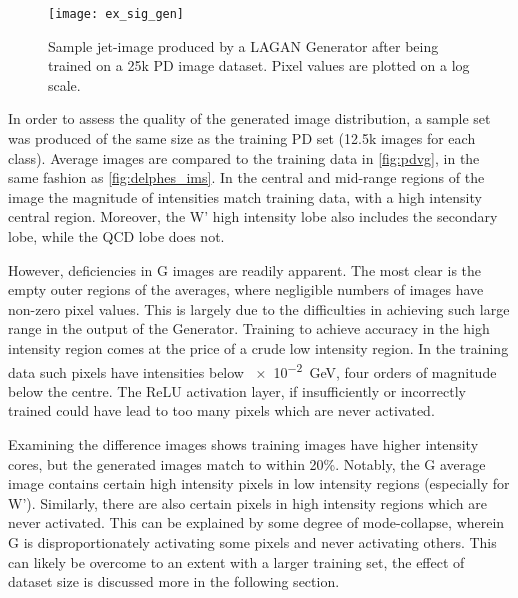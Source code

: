 \documentclass[twocolumn,twoside]{article}
\newcommand{\gev}{\giga\electronvolt}
\begin{document}
\begin{figure}[H]
	\centering
	\texttt{[image: ex\_sig\_gen]}
	
	\caption{Sample jet-image produced by a LAGAN Generator after being trained on a 25k PD image dataset. Pixel values are plotted on a log scale.}
	\label{fig:ex_sig_gen}
	
\end{figure}

In order to assess the quality of the generated image distribution, a sample set was produced of the same size as the training PD set (12.5k images for each class). Average images are compared to the training data in \cref{fig:pdvg}, in the same fashion as \cref{fig:delphes_ims}. In the central and mid-range regions of the image the magnitude of intensities match training data, with a high intensity central region. Moreover, the W' high intensity lobe also includes the secondary lobe, while the QCD lobe does not.

However, deficiencies in G images are readily apparent. The most clear is the empty outer regions of the averages, where negligible numbers of images have non-zero pixel values. This is largely due to the difficulties in achieving such large range in the output of the Generator. Training to achieve accuracy in the high intensity region comes at the price of a crude low intensity region. In the training data such pixels have intensities below \SI{e-2}{\gev}, four orders of magnitude below the centre. The ReLU activation layer, if insufficiently or incorrectly trained could have lead to too many pixels which are never activated.

Examining the difference images shows training images have higher intensity cores, but the generated images match to within 20\%. Notably, the G average image contains certain high intensity pixels in low intensity regions (especially for W'). Similarly, there are also certain pixels in high intensity regions which are never activated. This can be explained by some degree of mode-collapse, wherein G is disproportionately activating some pixels and never activating others. This can likely be overcome to an extent with a larger training set, the effect of dataset size is discussed more in the following section.  

\end{document}
